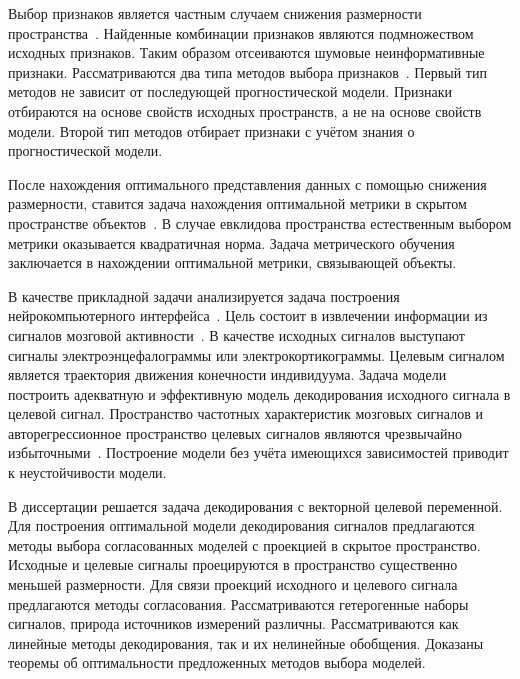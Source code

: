 \documentclass[11pt, a5paper]{dissert}
\begin{document}
Выбор признаков является частным случаем снижения размерности пространства~\cite{katrutsa2017comprehensive,katrutsa2015stress}. 
Найденные комбинации признаков являются подмножеством исходных признаков.
Таким образом отсеиваются шумовые неинформативные признаки.
Рассматриваются два типа методов выбора признаков~\cite{li2017feature,rodriguez2010quadratic,friedman2001elements}.
Первый тип методов не зависит от последующей прогностической модели.
Признаки отбираются на основе свойств исходных пространств, а не на основе свойств модели.
Второй тип методов отбирает признаки с учётом знания о прогностической модели. 

После нахождения оптимального представления данных с помощью снижения размерности, ставится задача нахождения оптимальной метрики в скрытом пространстве объектов~\cite{wang2017deep,davis2007information,kulis2012metric,yang2006distance,weinberger2009distance}.
В случае евклидова пространства естественным выбором метрики оказывается квадратичная норма.
Задача метрического обучения заключается в нахождении оптимальной метрики, связывающей объекты.

В качестве прикладной задачи анализируется задача построения нейрокомпьютерного интерфейса~\cite{wolpaw2000brain,allison2007brain}. 
Цель состоит в извлечении информации из сигналов мозговой активности~\cite{nagel2018modelling,zhang2020survey,chiarelli2018deep}. 
В качестве исходных сигналов выступают сигналы электроэнцефалограммы или электрокортикограммы. 
Целевым сигналом является траектория движения конечности индивидуума.
Задача модели построить адекватную и эффективную модель декодирования исходного сигнала в целевой сигнал.
Пространство частотных характеристик мозговых сигналов и авторегрессионное пространство целевых сигналов являются чрезвычайно избыточными~\cite{eliseyev2013recursive,eliseyev2011iterative}. 
Построение модели без учёта имеющихся зависимостей приводит к неустойчивости модели.

В диссертации решается задача декодирования с векторной целевой переменной. 
Для построения оптимальной модели декодирования сигналов предлагаются методы выбора согласованных моделей с проекцией в скрытое пространство.
Исходные и целевые сигналы проецируются в пространство существенно меньшей размерности. 
Для связи проекций исходного и целевого сигнала предлагаются методы согласования.
Рассматриваются гетерогенные наборы сигналов, природа источников измерений различны.
Рассматриваются как линейные методы декодирования, так и их нелинейные обобщения.
Доказаны теоремы об оптимальности предложенных методов выбора моделей.
\end{document}

